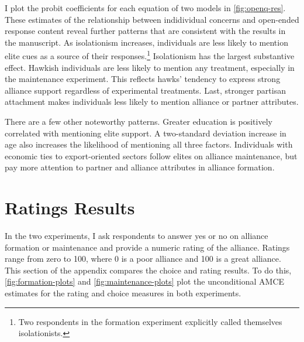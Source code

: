 \documentclass[12pt]{article}
\begin{document}
I plot the probit coefficients for each equation of two models in \autoref{fig:openq-res}. 
These estimates of the relationship between indidividual concerns and open-ended response content reveal further patterns that are consistent with the results in the manuscript.
As isolationism increases, individuals are less likely to mention elite cues as a source of their responses.\footnote{Two respondents in the formation experiment explicitly called themselves isolationists.} 
Isolationism has the largest substantive effect. 
Hawkish individuals are less likely to mention any treatment, especially in the maintenance experiment.
This reflects hawks' tendency to express strong alliance support regardless of experimental treatments.  
Last, stronger partisan attachment makes individuals less likely to mention alliance or partner attributes. 


There are a few other noteworthy patterns.
Greater education is positively correlated with mentioning elite support. 
A two-standard deviation increase in age also increases the likelihood of mentioning all three factors. 
Individuals with economic ties to export-oriented sectors follow elites on alliance maintenance, but pay more attention to partner and alliance attributes in alliance formation. 


\newpage


\section{Ratings Results}

In the two experiments, I ask respondents to answer yes or no on alliance formation or maintenance and provide a numeric rating of the alliance. 
Ratings range from zero to 100, where 0 is a poor alliance and 100 is a great alliance. 
This section of the appendix compares the choice and rating results. 
To do this, \autoref{fig:formation-plots} and \autoref{fig:maintenance-plots} plot the unconditional AMCE estimates for the rating and choice measures in both experiments.  
\end{document}
